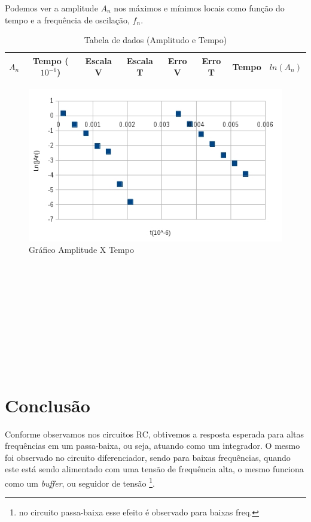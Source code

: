 \documentclass[12pt,letterpaper]{article}
\begin{document}
Podemos ver a amplitude $A_n$ nos máximos e mínimos locais como função do tempo e a frequência de oscilação, $f_n$.
\begin{table}
  \tiny
  \centering
  \begin{tabular}{|c|c|c|c|c|c|c|c|}
    \hline
    $A_n$ & Tempo ($10^{-6}$) & Escala V & Escala T & Erro V & Erro T & Tempo & $ln(A_n)$\\
    \hline
        
    \hline
  \end{tabular}
  \caption{Tabela de dados (Amplitudo e Tempo)}
\end{table}
\begin{figure}[!htb]
  \centering
  \label{mysub}
  \includegraphics[scale=0.50]{img/g1.jpg}
  \caption{Gráfico Amplitude X Tempo}
\end{figure}
\\
\\
\\
\\
\\
\\
\\
\\
\\

\section{Conclusão}
Conforme observamos nos circuitos RC, obtivemos a resposta esperada para altas frequências em um passa-baixa, ou seja, atuando como um integrador. O mesmo foi observado no circuito diferenciador, sendo para baixas frequências, quando este está sendo alimentado com uma tensão de frequência alta, o mesmo funciona como um \emph{buffer}, ou seguidor de tensão \footnote{no circuito passa-baixa esse efeito é observado para baixas freq.}.
\end{document}
